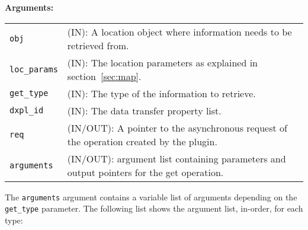 \textbf{Arguments:}\\
\begin{tabular}{l p{10cm}}
  {\tt obj} & (IN): A location object where information needs to be
  retrieved from.\\
  {\tt loc\_params} & (IN): The location parameters as
  explained in section~\ref{sec:map}.\\
  {\tt get\_type} & (IN): The type of the information to retrieve.\\
  {\tt dxpl\_id} & (IN): The data transfer property list.\\
  {\tt req} & (IN/OUT): A pointer to the asynchronous request of the
  operation created by the plugin.\\
  {\tt arguments} & (IN/OUT): argument list containing parameters and
  output pointers for the get operation. \\
\end{tabular}

The {\tt arguments} argument contains a variable list of arguments
depending on the {\tt get\_type} parameter. The following list shows
the argument list, in-order, for each type:

